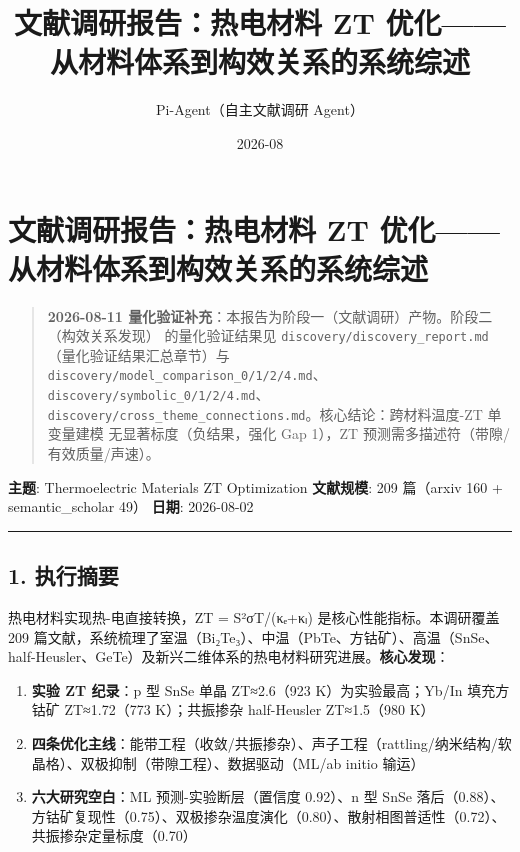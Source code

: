 \documentclass[12pt,a4paper]{ctexart}
\title{ 文献调研报告：热电材料 ZT 优化——从材料体系到构效关系的系统综述 }
\date{ 2026-08 }
\author{Pi-Agent（自主文献调研 Agent）}
\providecommand{\tightlist}{%
  \setlength{\itemsep}{0pt}\setlength{\parskip}{0pt}}
\begin{document}
\maketitle
\sloppy  %

\section{文献调研报告：热电材料 ZT 优化------从材料体系到构效关系的系统综述}\label{ux6587ux732eux8c03ux7814ux62a5ux544aux70edux7535ux6750ux6599-zt-ux4f18ux5316ux4eceux6750ux6599ux4f53ux7cfbux5230ux6784ux6548ux5173ux7cfbux7684ux7cfbux7edfux7efcux8ff0}

\begin{quote}
\textbf{2026-08-11 量化验证补充}：本报告为阶段一（文献调研）产物。阶段二（构效关系发现） 的量化验证结果见 \texttt{discovery/discovery\_report.md}（量化验证结果汇总章节）与 \texttt{discovery/model\_comparison\_0/1/2/4.md}、\texttt{discovery/symbolic\_0/1/2/4.md}、 \texttt{discovery/cross\_theme\_connections.md}。核心结论：跨材料温度-ZT 单变量建模 无显著标度（负结果，强化 Gap 1），ZT 预测需多描述符（带隙/有效质量/声速）。
\end{quote}

\textbf{主题}: Thermoelectric Materials ZT Optimization \textbf{文献规模}: 209 篇（arxiv 160 + semantic\_scholar 49） \textbf{日期}: 2026-08-02

\begin{center}\rule{0.5\linewidth}{0.5pt}\end{center}

\subsection{1. 执行摘要}\label{ux6267ux884cux6458ux8981}

热电材料实现热-电直接转换，ZT = S²σT/(κₑ+κₗ) 是核心性能指标。本调研覆盖 209 篇文献，系统梳理了室温（Bi₂Te₃）、中温（PbTe、方钴矿）、高温（SnSe、half-Heusler、GeTe）及新兴二维体系的热电材料研究进展。\textbf{核心发现}：

\begin{enumerate}
\def\labelenumi{\arabic{enumi}.}
\tightlist
\item
  \textbf{实验 ZT 纪录}：p 型 SnSe 单晶 ZT≈2.6（923 K）为实验最高；Yb/In 填充方钴矿 ZT≈1.72（773 K）；共振掺杂 half-Heusler ZT≈1.5（980 K）
\item
  \textbf{四条优化主线}：能带工程（收敛/共振掺杂）、声子工程（rattling/纳米结构/软晶格）、双极抑制（带隙工程）、数据驱动（ML/ab initio 输运）
\item
  \textbf{六大研究空白}：ML 预测-实验断层（置信度 0.92）、n 型 SnSe 落后（0.88）、方钴矿复现性（0.75）、双极掺杂温度演化（0.80）、散射相图普适性（0.72）、共振掺杂定量标度（0.70）
\end{enumerate}
\end{document}
